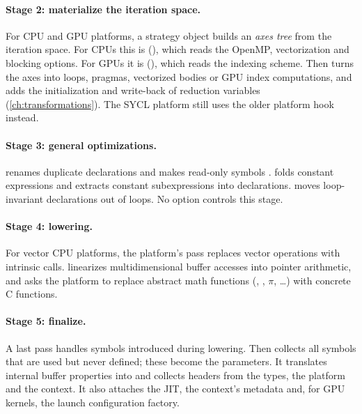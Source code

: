 \paragraph{Stage 2: materialize the iteration space.}
For CPU and GPU platforms, a strategy object builds an \emph{axes tree} from the
iteration space. For CPUs this is 
(), which reads the OpenMP, vectorization and
blocking options. For GPUs it is 
(), which reads the indexing scheme. Then
 turns the axes into loops, pragmas, vectorized bodies or GPU index
computations, and  adds the initialization and write-back of
reduction variables (\cref{ch:transformations}). The SYCL platform still uses the older
platform hook  instead.

\paragraph{Stage 3: general optimizations.}
 renames duplicate declarations and makes read-only symbols
.  folds constant expressions and extracts constant
subexpressions into  declarations. 
moves loop-invariant declarations out of loops. No option controls this stage.

\paragraph{Stage 4: lowering.}
For vector CPU platforms, the platform's  pass replaces vector
operations with intrinsic calls.  linearizes multidimensional buffer
accesses into pointer arithmetic, and  asks the platform to replace
abstract math functions (, , $\pi$, \dots) with concrete C
functions.

\paragraph{Stage 5: finalize.}
A last  pass handles symbols introduced during lowering. Then
 collects all symbols that are used but never defined; these become
the parameters. It translates internal buffer properties into  and
collects headers from the types, the platform and the context. It also attaches the JIT,
the context's metadata and, for GPU kernels, the launch configuration factory.

